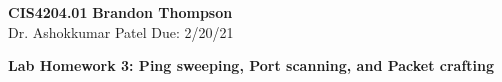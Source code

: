 \noindent
\textbf{CIS4204.01} \hfill \textbf{Brandon Thompson} \\
\normalsize Dr. Ashokkumar Patel \hfill Due: 2/20/21\\

\begin{center}
\textbf{Lab Homework 3: Ping sweeping, Port scanning, and Packet crafting}
\end{center}